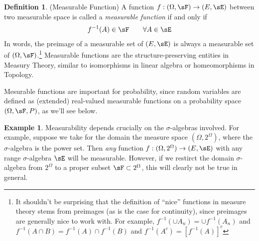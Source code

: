 \documentclass[12pt]{article}
\theoremstyle{plain}
\theoremstyle{definition}
\newtheorem{defn}[thm]{Definition}
\newtheorem{ex}[thm]{Example}
\theoremstyle{remark}
\newcommand{\ra}{\rightarrow}
\begin{document}
\begin{defn}(Measurable Function)
A function $f:(\Omega,\sF)\ra (E,\sE)$ between two measurable space
is called a \emph{measurable function} if and only if
\begin{align*}
  f^{-1}(A) \in \sF \qquad \forall A\in \sE
\end{align*}
In words, the preimage of a measurable set of $(E,\sE)$ is always a
measurable set of $(\Omega,\sF)$.\footnote{%
  It shouldn't be surprising that the definition of ``nice'' functions
  in measure theory stems from preimages (as is the case for
  continuity), since preimages are generally nice to work with. For
  example, $f^{-1}\left( \cup A_n \right) = \cup f^{-1}(A_n)$ and
  $f^{-1}(A\cap B) = f^{-1}(A)\cap f^{-1}(B)$ and $f^{-1}(A^c)=
  [f^{-1}(A)]^c$
}
Measurable functions are the structure-preserving entities in Measury
Theory, similar to isomorphisms in linear algebra or homeomorphisms in
Topology.

Mesurable functions are important for probability, since random
variables are defined as (extended) real-valued measurable functions on
a probability space $(\Omega,\sF,P)$, as we'll see below.
\end{defn}

\begin{ex}
Measurability depends crucially on the $\sigma$-algebras involved. For
example, suppose we take for the domain the measure space
$(\Omega,2^\Omega)$, where the $\sigma$-algebra is the power set. Then
\emph{any} function $f:(\Omega,2^\Omega)\ra (E,\sE)$ with any range
$\sigma$-algebra $\sE$ will be measurable. However, if we restirct the
domain $\sigma$-algebra from $2^\Omega$ to a proper subset
$\sF \subset 2^\Omega$, this will clearly not be true in general.
\end{ex}


\end{document}
